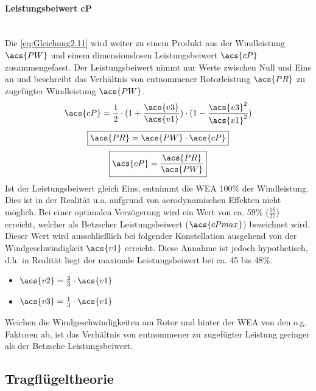 \paragraph{Leistungsbeiwert \acs{cP}}\mbox{}\smallskip\\
Die \autoref{eq:Gleichung2.11} wird weiter zu einem Produkt aus der Windleistung $\acs{PW}$ und einem dimensionslosen Leistungsbeiwert $\acs{cP}$ zusammengefasst. Der Leistungsbeiwert nimmt nur Werte zwischen Null und Eins an und beschreibt das Verhältnis von entnommener Rotorleistung $\acs{PR}$ zu zugefügter Windleistung $\acs{PW}$.
\begin{align*}
    \acs{cP} = \frac{1}{2} \cdot (1 + \frac{\acs{v3}}{\acs{v1}}) \cdot (1 - \frac{\acs{v3}^2}{\acs{v1}^2})
\end{align*}
\begin{equation}\label{eq:Gleichung2.12}
    \boxed{\acs{PR} = \acs{PW} \cdot \acs{cP}}
\end{equation}
\begin{equation}\label{eq:Gleichung2.13}
    \boxed{\acs{cP} = \frac{\acs{PR}}{\acs{PW}}}
\end{equation}
\newline
Ist der Leistungsbeiwert gleich Eins, entnimmt die WEA 100\% der Windleistung. Dies ist in der Realität u.a. aufgrund von aerodynamischen Effekten nicht möglich. Bei einer optimalen Verzögerung wird ein Wert von ca. 59\% ($\frac{16}{27}$) erreicht, welcher als Betzscher Leistungsbeiwert ($\acs{cPmax}$) bezeichnet wird. Dieser Wert wird ausschließlich bei folgender Konstellation ausgehend von der Windgeschwindigkeit $\acs{v1}$ erreicht. Diese Annahme ist jedoch hypothetisch, d.h. in Realität liegt der maximale Leistungsbeiwert bei ca. 45 bis 48\%.
\begin{itemize}
    \item $\acs{v2} = \frac{2}{3} \cdot \acs{v1}$
    \item $\acs{v3} = \frac{1}{3} \cdot \acs{v1}$
\end{itemize}
Weichen die Windgeschwindigkeiten am Rotor und hinter der WEA von den o.g. Faktoren ab, ist das Verhältnis von entnommener zu zugefügter Leistung geringer als der Betzsche Leistungsbeiwert.

\subsection{Tragflügeltheorie}

